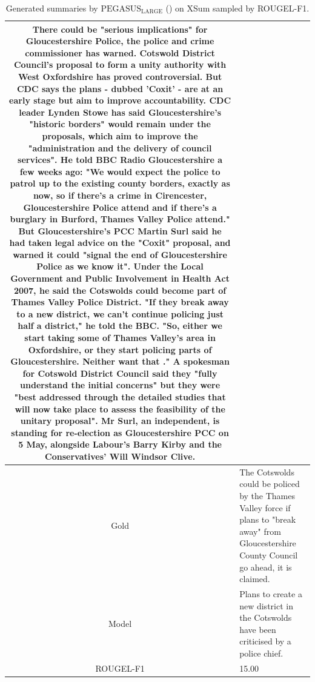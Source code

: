 \begin{table}[bth!]
\begin{tabular}{c|p{}}
There could be "serious implications" for Gloucestershire Police, the police and crime commissioner has warned. Cotswold District Council's proposal to form a unity authority with West Oxfordshire has proved controversial. But CDC says the plans - dubbed 'Coxit' - are at an early stage but aim to improve accountability. CDC leader Lynden Stowe has said Gloucestershire's "historic borders" would remain under the proposals, which aim to improve the "administration and the delivery of council services". He told BBC Radio Gloucestershire a few weeks ago: "We would expect the police to patrol up to the existing county borders, exactly as now, so if there's a crime in Cirencester, Gloucestershire Police attend and if there's a burglary in Burford, Thames Valley Police attend." But Gloucestershire's PCC Martin Surl said he had taken legal advice on the "Coxit" proposal, and warned it could "signal the end of Gloucestershire Police as we know it". Under the Local Government and Public Involvement in Health Act 2007, he said the Cotswolds could become part of Thames Valley Police District. "If they break away to a new district, we can't continue policing just half a district," he told the BBC. "So, either we start taking some of Thames Valley's area in Oxfordshire, or they start policing parts of Gloucestershire. Neither want that ." A spokesman for Cotswold District Council said they "fully understand the initial concerns" but they were "best addressed through the detailed studies that will now take place to assess the feasibility of the unitary proposal". Mr Surl, an independent, is standing for re-election as Gloucestershire PCC on 5 May, alongside Labour's Barry Kirby and the Conservatives' Will Windsor Clive.
\\ \hline
Gold & 
The Cotswolds could be policed by the Thames Valley force if plans to "break away" from Gloucestershire County Council go ahead, it is claimed.
\\ \hline
Model & 
Plans to create a new district in the Cotswolds have been criticised by a police chief.
\\ \hline
ROUGEL-F1 & 
15.00
\\ \hline
\end{tabular}
\caption{Generated summaries by $\text{PEGASUS}_{\text{LARGE}}$ (\gnews) on XSum sampled by ROUGEL-F1.}
\end{table}

